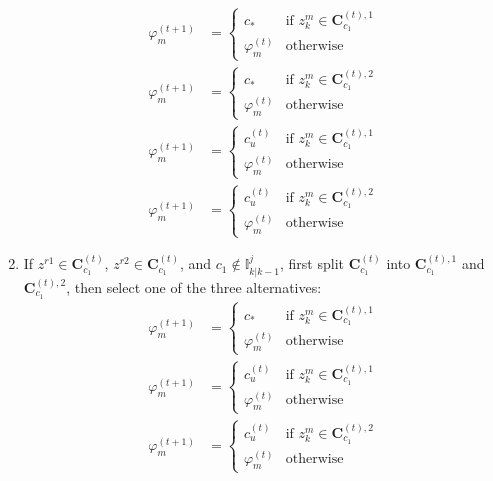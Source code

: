 \begin{enumerate}
    \begin{subequations}
    \begin{align}
        \varphi_m^{(t+1)} & = 
        \begin{cases}
            c_* & \text{if  } z^m_k\in\mathbf{C}^{(t),1}_{c_1}\\
            \varphi_m^{(t)} & \text{otherwise}
        \end{cases}\\
        \varphi_m^{(t+1)} & = 
        \begin{cases}
            c_* & \text{if  } z^m_k\in\mathbf{C}^{(t),2}_{c_1}\\
            \varphi_m^{(t)} & \text{otherwise}
        \end{cases}\\
        \varphi_m^{(t+1)} & = 
        \begin{cases}
            c_u^{(t)} & \text{if  } z^m_k\in\mathbf{C}^{(t),1}_{c_1}\\
            \varphi_m^{(t)} & \text{otherwise}
        \end{cases}\\
        \varphi_m^{(t+1)} & = 
        \begin{cases}
            c_u^{(t)} & \text{if  } z^m_k\in\mathbf{C}^{(t),2}_{c_1}\\
            \varphi_m^{(t)} & \text{otherwise}
        \end{cases}
    \end{align}
    \end{subequations}
    \item If $z^{r1}\in\mathbf{C}_{c_1}^{(t)}$, $z^{r2}\in\mathbf{C}_{c_1}^{(t)}$, and $c_1\notin\mathbb{I}^j_{k|k-1}$, first split $\mathbf{C}_{c_1}^{(t)}$ into $\mathbf{C}_{c_1}^{(t),1}$ and $\mathbf{C}_{c_1}^{(t),2}$, then select one of the three alternatives: 
    \begin{subequations}
    \begin{align}
        \varphi_m^{(t+1)} & = 
        \begin{cases}
            c_* & \text{if  } z^m_k\in\mathbf{C}^{(t),1}_{c_1}\\
            \varphi_m^{(t)} & \text{otherwise}
        \end{cases}\\
        \varphi_m^{(t+1)} & = 
        \begin{cases}
            c_u^{(t)} & \text{if  } z^m_k\in\mathbf{C}^{(t),1}_{c_1}\\
            \varphi_m^{(t)} & \text{otherwise}
        \end{cases}\\
        \varphi_m^{(t+1)} & = 
        \begin{cases}
            c_u^{(t)} & \text{if  } z^m_k\in\mathbf{C}^{(t),2}_{c_1}\\
            \varphi_m^{(t)} & \text{otherwise}
        \end{cases}
    \end{align}
    \end{subequations}
\end{enumerate}
